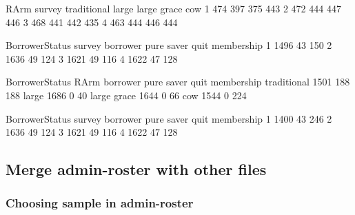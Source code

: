 \begin{Schunk}
\begin{Soutput}
      RArm
survey traditional large large grace cow
     1         474   397         375 443
     2         472   444         447 446
     3         468   441         442 435
     4         463   444         446 444
\end{Soutput}
\begin{Soutput}
      BorrowerStatus
survey borrower pure saver quit membership
     1     1496         43             150
     2     1636         49             124
     3     1621         49             116
     4     1622         47             128
\end{Soutput}
\begin{Soutput}
             BorrowerStatus
RArm          borrower pure saver quit membership
  traditional     1501        188             188
  large           1686          0              40
  large grace     1644          0              66
  cow             1544          0             224
\end{Soutput}
\begin{Soutput}
      BorrowerStatus
survey borrower pure saver quit membership
     1     1400         43             246
     2     1636         49             124
     3     1621         49             116
     4     1622         47             128
\end{Soutput}
\end{Schunk}

\subsection{Merge admin-roster with other files}

\subsubsection{Choosing sample in admin-roster}

